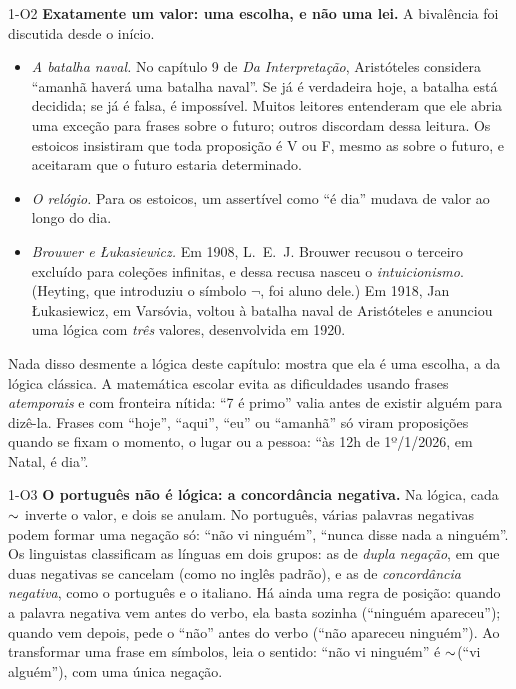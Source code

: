 \begin{obs}{1-O2}
\textbf{Exatamente um valor: uma escolha, e não uma lei.} A bivalência foi discutida desde o início.
\begin{itemize}[leftmargin=1.2em,itemsep=1pt]
  \item \emph{A batalha naval.} No capítulo 9 de \emph{Da Interpretação}, Aristóteles considera \enquote{amanhã haverá uma batalha naval}. Se já é verdadeira hoje, a batalha está decidida; se já é falsa, é impossível. Muitos leitores entenderam que ele abria uma exceção para frases sobre o futuro; outros discordam dessa leitura. Os estoicos insistiram que toda proposição é V ou F, mesmo as sobre o futuro, e aceitaram que o futuro estaria determinado.
  \item \emph{O relógio.} Para os estoicos, um assertível como \enquote{é dia} mudava de valor ao longo do dia.
  \item \emph{Brouwer e Łukasiewicz.} Em 1908, L.~E.~J. Brouwer recusou o terceiro excluído para coleções infinitas, e dessa recusa nasceu o \emph{intuicionismo}. (Heyting, que introduziu o símbolo $\neg$, foi aluno dele.) Em 1918, Jan Łukasiewicz, em Varsóvia, voltou à batalha naval de Aristóteles e anunciou uma lógica com \emph{três} valores, desenvolvida em 1920.
\end{itemize}
Nada disso desmente a lógica deste capítulo: mostra que ela é uma escolha, a da lógica clássica. A matemática escolar evita as dificuldades usando frases \emph{atemporais} e com fronteira nítida: \enquote{7 é primo} valia antes de existir alguém para dizê-la. Frases com \enquote{hoje}, \enquote{aqui}, \enquote{eu} ou \enquote{amanhã} só viram proposições quando se fixam o momento, o lugar ou a pessoa: \enquote{às 12h de 1º/1/2026, em Natal, é dia}.
\end{obs}

\begin{obs}{1-O3}
\textbf{O português não é lógica: a concordância negativa.} Na lógica, cada ${\sim}$ inverte o valor, e dois se anulam. No português, várias palavras negativas podem formar uma negação só: \enquote{não vi ninguém}, \enquote{nunca disse nada a ninguém}. Os linguistas classificam as línguas em dois grupos: as de \emph{dupla negação}, em que duas negativas se cancelam (como no inglês padrão), e as de \emph{concordância negativa}, como o português e o italiano. Há ainda uma regra de posição: quando a palavra negativa vem antes do verbo, ela basta sozinha (\enquote{ninguém apareceu}); quando vem depois, pede o \enquote{não} antes do verbo (\enquote{não apareceu ninguém}). Ao transformar uma frase em símbolos, leia o sentido: \enquote{não vi ninguém} é ${\sim}$(\enquote{vi alguém}), com uma única negação.
\end{obs}

